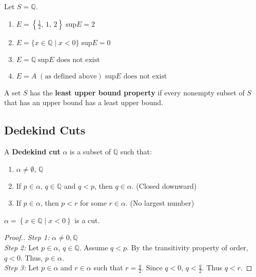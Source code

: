 \documentclass[../main.tex]{subfiles}
\begin{document}
\begin{example}[]
    Let \( S = \mathbb{Q} \).
    \begin{enumerate}
        \item \( E = \left\{ \displaystyle \frac{1}{2},\, 1,\, 2 \right\} \; \boxed{ \text{sup}E= 2 } \)
        \item \( E = \{x \in \mathbb{Q} \mid x < 0 \} \; \boxed{\text{sup}E = 0}\)
        \item \( E = \mathbb{Q} \; \boxed{\text{sup}E \text{ does not exist}} \)
        \item \( E = A \; (\text{as defined above}) \; \boxed{\text{sup}E \text{ does not exist}} \)
    \end{enumerate}
\end{example}

\begin{definition}
    A set \( S \) has the \textbf{least upper bound property} if every nonempty subset of \( S \) that has an upper bound has a least upper bound.
\end{definition}


\subsection{Dedekind Cuts}

\begin{definition}
    A \textbf{Dedekind cut} \( \alpha \) is a subset of \( \mathbb{Q} \) such that:
    \begin{enumerate}
        \item \( \alpha  \neq \emptyset, \, \mathbb{Q} \)
        \item If \( p \in \alpha \), \( q \in \mathbb{Q} \) and \( q < p \), then \( q \in \alpha \). (Closed downward)
        \item If \( p \in \alpha \), then \( p < r \) for some \( r \in \alpha \). (No largest number)
    \end{enumerate}
\end{definition}

\begin{example}[]
    \( \alpha = \left\{ x \in \mathbb{Q} \mid x < 0 \right\} \) is a cut.
    \begin{proof}[Proof.]
        \textit{Step 1:} \( \alpha \neq 0, \mathbb{Q} \) \checkmark \\
        \textit{Step 2:} Let \( p \in \alpha \), \( q \in \mathbb{Q} \). Assume \( q < p \).
        By the transitivity property of order, \( q < 0 \).
        Thus, \( p \in \alpha \). \checkmark \\
        \textit{Step 3:} Let \( p \in \alpha \) and \( r \in \alpha \) such that \( r = \displaystyle \frac{q}{2} \).
        Since \( q < 0 \), \( q < \displaystyle \frac{q}{2} \). Thus \( q < r \). \checkmark
    \end{proof}
\end{example}
\end{document}

